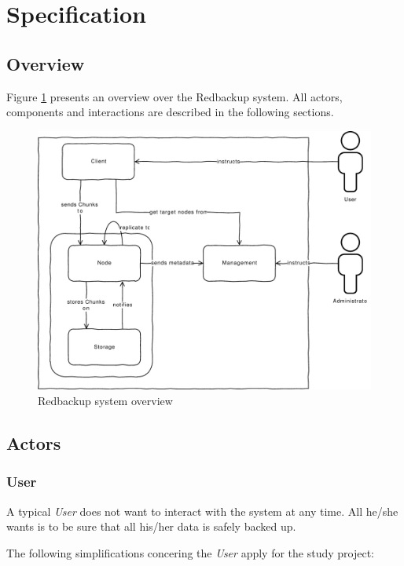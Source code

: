 
\section{Specification}\label{sec:specification}

\subsection{Overview}
Figure \ref{fig:architecture-overview} presents an overview over the Redbackup system. All actors, components and interactions are described in the following sections.

\begin{figure}[h]
    \centering
    \includegraphics[width=1\linewidth]{resources/architecture_overview}
    \caption{Redbackup system overview}
    \label{fig:architecture-overview}
\end{figure}

\subsection{Actors}

\subsubsection{User}
A typical \emph{User} does not want to interact with the system at any time. All he/she wants is to be sure that all his/her data is safely backed up.

The following simplifications concering the \emph{User} apply for the study project:

